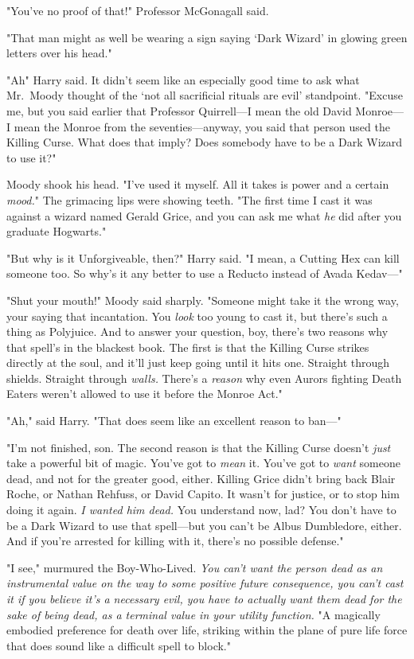 "You've no proof of that!" Professor McGonagall said.

"That man might as well be wearing a sign saying `Dark Wizard' in glowing green
letters over his head."

"Ah{\el}" Harry said. It didn't seem like an especially good time to ask
what Mr.~Moody thought of the `not all sacrificial rituals are evil'
standpoint. "Excuse me, but you said earlier that Professor Quirrell---I mean
the old David Monroe---I mean the Monroe from the seventies---anyway, you said
that person used the Killing Curse. What does that imply? Does somebody have to
be a Dark Wizard to use it?"

Moody shook his head. "I've used it myself. All it takes is power and a certain
\emph{mood.}" The grimacing lips were showing teeth. "The first time I cast it
was against a wizard named Gerald Grice, and you can ask me what \emph{he} did
after you graduate Hogwarts."

"But why is it Unforgiveable, then?" Harry said. "I mean, a Cutting Hex can
kill someone too. So why's it any better to use a Reducto instead of Avada
Kedav\mbox{---}"

"Shut your mouth!" Moody said sharply. "Someone might take it the wrong way,
your saying that incantation. You \emph{look} too young to cast it, but there's
such a thing as Polyjuice. And to answer your question, boy, there's two
reasons why that spell's in the blackest book. The first is that the Killing
Curse strikes directly at the soul, and it'll just keep going until it hits
one. Straight through shields. Straight through \emph{walls.} There's a
\emph{reason} why even Aurors fighting Death Eaters weren't allowed to use it
before the Monroe Act."

"Ah," said Harry. "That does seem like an excellent reason to ban\mbox{---}"

"I'm not finished, son. The second reason is that the Killing Curse doesn't
\emph{just} take a powerful bit of magic. You've got to \emph{mean} it. You've
got to \emph{want} someone dead, and not for the greater good, either. Killing
Grice didn't bring back Blair Roche, or Nathan Rehfuss, or David Capito. It
wasn't for justice, or to stop him doing it again. \emph{I wanted him dead.}
You understand now, lad? You don't have to be a Dark Wizard to use that
spell---but you can't be Albus Dumbledore, either. And if you're arrested for
killing with it, there's no possible defense."

"I{\el} see," murmured the Boy-Who-Lived. \emph{You can't want the person
dead as an instrumental value on the way to some positive future consequence,
you can't cast it if you believe it's a necessary evil, you have to actually
want them dead for the sake of being dead, as a terminal value in your utility
function.} "A magically embodied preference for death over life, striking
within the plane of pure life force{\el} that does sound like a difficult
spell to block."

